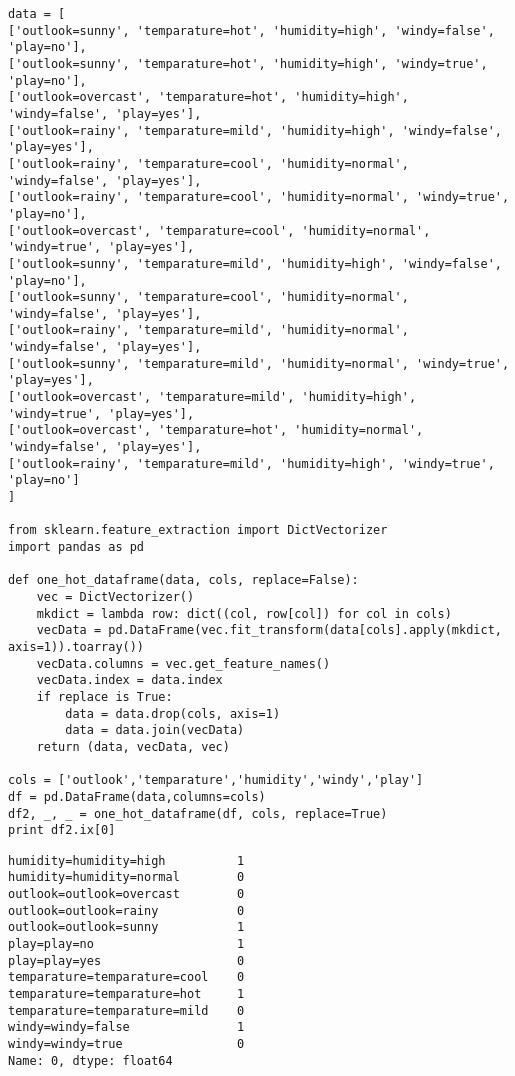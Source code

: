 \documentclass[12pt,fleqn]{article}\usepackage{../common}
\begin{document}
\begin{verbatim}
data = [
['outlook=sunny', 'temparature=hot', 'humidity=high', 'windy=false', 'play=no'],
['outlook=sunny', 'temparature=hot', 'humidity=high', 'windy=true', 'play=no'],
['outlook=overcast', 'temparature=hot', 'humidity=high', 'windy=false', 'play=yes'],
['outlook=rainy', 'temparature=mild', 'humidity=high', 'windy=false', 'play=yes'],
['outlook=rainy', 'temparature=cool', 'humidity=normal', 'windy=false', 'play=yes'],
['outlook=rainy', 'temparature=cool', 'humidity=normal', 'windy=true', 'play=no'],
['outlook=overcast', 'temparature=cool', 'humidity=normal', 'windy=true', 'play=yes'],
['outlook=sunny', 'temparature=mild', 'humidity=high', 'windy=false', 'play=no'],
['outlook=sunny', 'temparature=cool', 'humidity=normal', 'windy=false', 'play=yes'],
['outlook=rainy', 'temparature=mild', 'humidity=normal', 'windy=false', 'play=yes'],
['outlook=sunny', 'temparature=mild', 'humidity=normal', 'windy=true', 'play=yes'],
['outlook=overcast', 'temparature=mild', 'humidity=high', 'windy=true', 'play=yes'],
['outlook=overcast', 'temparature=hot', 'humidity=normal', 'windy=false', 'play=yes'],
['outlook=rainy', 'temparature=mild', 'humidity=high', 'windy=true', 'play=no']
]

from sklearn.feature_extraction import DictVectorizer
import pandas as pd

def one_hot_dataframe(data, cols, replace=False):
    vec = DictVectorizer()
    mkdict = lambda row: dict((col, row[col]) for col in cols)
    vecData = pd.DataFrame(vec.fit_transform(data[cols].apply(mkdict, axis=1)).toarray())
    vecData.columns = vec.get_feature_names()
    vecData.index = data.index
    if replace is True:
        data = data.drop(cols, axis=1)
        data = data.join(vecData)
    return (data, vecData, vec)

cols = ['outlook','temparature','humidity','windy','play']
df = pd.DataFrame(data,columns=cols)
df2, _, _ = one_hot_dataframe(df, cols, replace=True)
print df2.ix[0]
\end{verbatim}

\begin{verbatim}
humidity=humidity=high          1
humidity=humidity=normal        0
outlook=outlook=overcast        0
outlook=outlook=rainy           0
outlook=outlook=sunny           1
play=play=no                    1
play=play=yes                   0
temparature=temparature=cool    0
temparature=temparature=hot     1
temparature=temparature=mild    0
windy=windy=false               1
windy=windy=true                0
Name: 0, dtype: float64
\end{verbatim}
\end{document}
